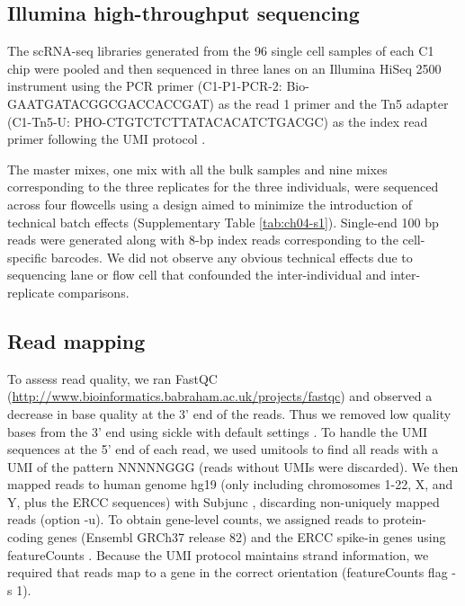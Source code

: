 \subsection{Illumina high-throughput
sequencing}\label{illumina-high-throughput-sequencing}

The scRNA-seq libraries generated from the 96 single cell samples of
each C1 chip were pooled and then sequenced in three lanes on an
Illumina HiSeq 2500 instrument using the PCR primer (C1-P1-PCR-2:
Bio-GAATGATACGGCGACCACCGAT) as the read 1 primer and the Tn5 adapter
(C1-Tn5-U: PHO-CTGTCTCTTATACACATCTGACGC) as the index read primer
following the UMI protocol \citep{Islam2014}.

The master mixes, one mix with all the bulk samples and nine mixes
corresponding to the three replicates for the three individuals, were
sequenced across four flowcells using a design aimed to minimize the
introduction of technical batch effects (Supplementary Table \ref{tab:ch04-s1}).
Single-end 100 bp reads were generated along with 8-bp index reads
corresponding to the cell-specific barcodes. We did not observe any
obvious technical effects due to sequencing lane or flow cell that
confounded the inter-individual and inter-replicate comparisons.

\subsection{Read mapping}\label{read-mapping}

To assess read quality, we ran FastQC
(\url{http://www.bioinformatics.babraham.ac.uk/projects/fastqc}) and
observed a decrease in base quality at the 3' end of the reads. Thus we
removed low quality bases from the 3' end using sickle with default
settings \citep{Joshi2011}. To handle the UMI sequences at the 5' end of
each read, we used umitools \citep{umitools} to find all reads with a UMI
of the pattern NNNNNGGG (reads without UMIs were discarded). We then
mapped reads to human genome hg19 (only including chromosomes 1-22, X,
and Y, plus the ERCC sequences) with Subjunc \citep{Liao2013}, discarding
non-uniquely mapped reads (option -u). To obtain gene-level counts, we
assigned reads to protein-coding genes (Ensembl GRCh37 release 82) and
the ERCC spike-in genes using featureCounts \citep{Liao2014}. Because the
UMI protocol maintains strand information, we required that reads map to
a gene in the correct orientation (featureCounts flag -s 1).

